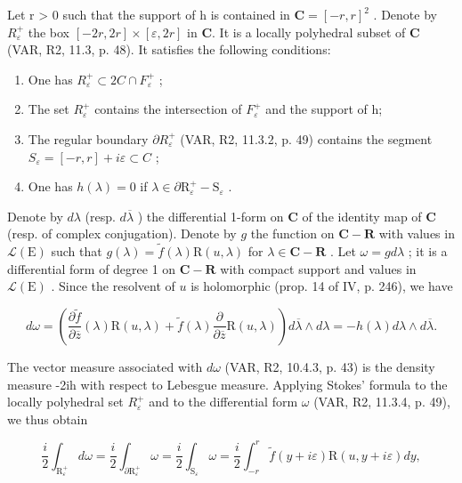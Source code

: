 Let r > 0 such that the support of h is contained in \(\mathbf{C} = [-r, r]^{2}\) . Denote by \(R_{\varepsilon}^{+}\) the box \([-2r, 2r] \times [\varepsilon, 2r]\) in \(\mathbf{C}\). It is a locally polyhedral subset of \(\mathbf{C}\) (VAR, R2, 11.3, p. 48). It satisfies the following conditions:

\begin{enumerate}
\def\labelenumi{(\roman{enumi})}
\item
  One has \(R_{\varepsilon}^{+} \subset 2C \cap F_{\varepsilon}^{+}\) ;
\item
  The set \(R_{\varepsilon}^{+}\) contains the intersection of \(F_{\varepsilon}^{+}\) and the support of h;
\item
  The regular boundary \(\partial R_{\varepsilon}^{+}\) (VAR, R2, 11.3.2, p. 49) contains the segment \(S_{\varepsilon} = [-r, r] + i\varepsilon \subset C\) ;
\item
  One has \(h(\lambda) = 0\) if \(\lambda \in \partial \mathrm{R}_{\varepsilon}^{+} - \mathrm{S}_{\varepsilon}\) .
\end{enumerate}

Denote by \(d\lambda\) (resp. \(d\overline{\lambda}\) ) the differential 1-form on \(\mathbf{C}\) of the identity map of \(\mathbf{C}\) (resp. of complex conjugation). Denote by \(g\) the function on \(\mathbf{C} - \mathbf{R}\) with values in \(\mathcal{L}(\mathrm{E})\) such that \(g(\lambda) = \widetilde{f}(\lambda)\mathrm{R}(u,\lambda)\) for \(\lambda \in \mathbf{C} - \mathbf{R}\) . Let \(\omega = g d\lambda\) ; it is a differential form of degree 1 on \(\mathbf{C} - \mathbf{R}\) with compact support and values in \(\mathcal{L}(\mathrm{E})\) . Since the resolvent of \(u\) is holomorphic (prop. 14 of IV, p. 246), we have

\[
d \omega = \left(\frac {\partial \widetilde {f}}{\partial \overline {{z}}} (\lambda) \mathrm{R} (u, \lambda) + \widetilde {f} (\lambda) \frac {\partial}{\partial \overline {{z}}} \mathrm{R} (u, \lambda)\right) d \overline {{\lambda}} \wedge d \lambda = - h (\lambda) d \lambda \wedge d \overline {{\lambda}}.
\]

The vector measure associated with \(d\omega\) (VAR, R2, 10.4.3, p. 43) is the density measure -2ih with respect to Lebesgue measure. Applying Stokes' formula to the locally polyhedral set \(R_{\varepsilon}^{+}\) and to the differential form \(\omega\) (VAR, R2, 11.3.4, p. 49), we thus obtain

\[
\frac {i}{2} \int_ {\mathrm{R} _ {\varepsilon} ^ {+}} d \omega = \frac {i}{2} \int_ {\partial \mathrm{R} _ {\varepsilon} ^ {+}} \omega = \frac {i}{2} \int_ {\mathrm{S} _ {\varepsilon}} \omega = \frac {i}{2} \int_ {- r} ^ {r} \widetilde {f} (y + i \varepsilon) \mathrm{R} (u, y + i \varepsilon) d y,
\]

